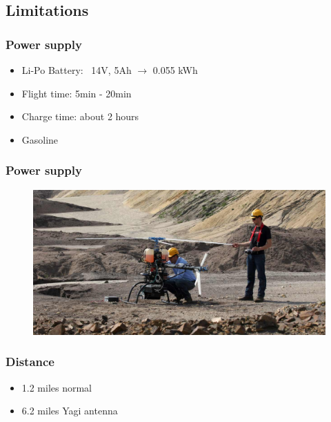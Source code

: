 \subsection{Limitations}

\begin{frame}
\frametitle{Power supply}

  \begin{itemize}
    \item Li-Po Battery: ~14V, 5Ah $\rightarrow$ 0.055 kWh
    \item Flight time: 5min - 20min
    \item Charge time: about 2 hours
	\item Gasoline
  \end{itemize}
  
\end{frame}



\begin{frame}
\frametitle{Power supply}

  \begin{figure}
  \includegraphics[scale=0.24]{pic/03_our-copter/aeroscout.jpg}
  \end{figure}
  
\end{frame}



\begin{frame}
\frametitle{Distance}

  \begin{itemize}
    \item 1.2 miles normal
    \item 6.2 miles Yagi antenna
  \end{itemize}
  
    
\end{frame}



